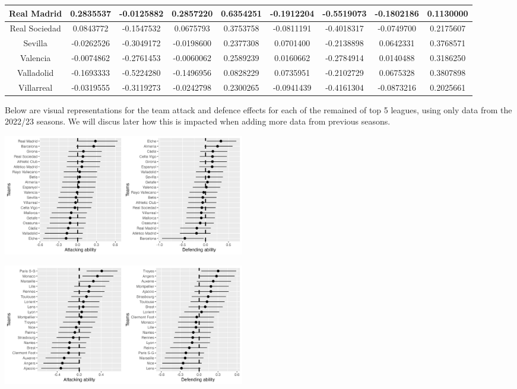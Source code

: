 \documentclass[
]{article}
\begin{document}
\begin{table}
{\begin{tabular}[t]{c|c|c|c|c|c|c|c|c}
\hline
Real Madrid & 0.2835537 & -0.0125882 & 0.2857220 & 0.6354251 & -0.1912204 & -0.5519073 & -0.1802186 & 0.1130000\\
\hline
Real Sociedad & 0.0843772 & -0.1547532 & 0.0675793 & 0.3753758 & -0.0811191 & -0.4018317 & -0.0749700 & 0.2175607\\
\hline
Sevilla & -0.0262526 & -0.3049172 & -0.0198600 & 0.2377308 & 0.0701400 & -0.2138898 & 0.0642331 & 0.3768571\\
\hline
Valencia & -0.0074862 & -0.2761453 & -0.0060062 & 0.2589239 & 0.0160662 & -0.2784914 & 0.0140488 & 0.3186250\\
\hline
Valladolid & -0.1693333 & -0.5224280 & -0.1496956 & 0.0828229 & 0.0735951 & -0.2102729 & 0.0675328 & 0.3807898\\
\hline
Villarreal & -0.0319555 & -0.3119273 & -0.0242798 & 0.2300265 & -0.0941439 & -0.4161304 & -0.0873216 & 0.2025661\\
\hline
\end{tabular}}
\end{table}

Below are visual representations for the team attack and defence effects
for each of the remained of top 5 leagues, using only data from the
2022/23 seasons. We will discus later how this is impacted when adding
more data from previous seasons.

\begin{center}\includegraphics[width=400px]{llattdef} \end{center}

\begin{center}\includegraphics[width=400px]{l1attdef} \end{center}
\end{document}
